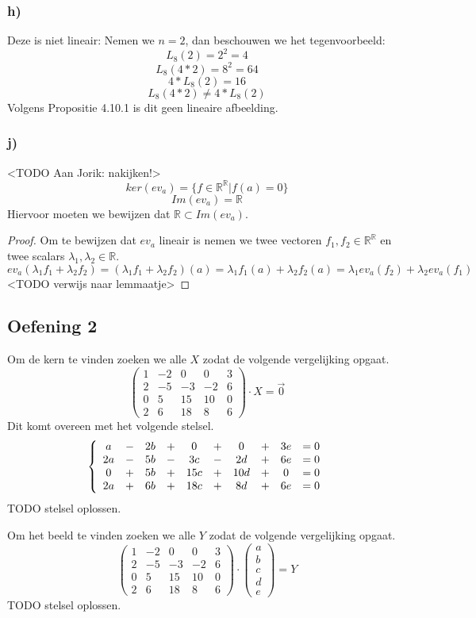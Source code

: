 \documentclass[lineaire_algebra_oplossingen.tex]{subfiles}
\begin{document}
\subsubsection*{h)}

Deze is niet lineair:
Nemen we $n=2$, dan beschouwen we het tegenvoorbeeld:
\[L_8(2) = 2^2 = 4\]
\[L_8(4*2) = 8^2 = 64\]
\[4*L_8(2) = 16\]
\[L_8(4*2) \neq 4*L_8(2)\]
Volgens Propositie 4.10.1 is dit geen lineaire afbeelding.\\

\subsubsection*{j)}
<TODO Aan Jorik: nakijken!>
\[
ker(ev_a) = \{ f \in \mathbb{R}^{\mathbb{R}} | f(a) = 0\}
\]
\[
Im(ev_a) = \mathbb{R}
\]
Hiervoor moeten we bewijzen dat $\mathbb{R} \subset Im(ev_a)$.
\begin{proof}
Om te bewijzen dat $ev_a$ lineair is nemen we twee vectoren $f_1,f_2 \in \mathbb{R}^{\mathbb{R}}$ en twee scalars $\lambda_1, \lambda_2 \in \mathbb{R}$.
\[
ev_a(\lambda_1f_1 + \lambda_2f_2) = (\lambda_1f_1 + \lambda_2f_2)(a) = \lambda_1f_1(a) + \lambda_2f_2(a) = \lambda_1ev_a(f_2) + \lambda_2ev_a(f_1)
\]
<TODO verwijs naar lemmaatje>
\end{proof}

\subsection{Oefening 2}
Om de kern te vinden zoeken we alle $X$ zodat de volgende vergelijking opgaat.
\[
\begin{pmatrix}
1 & -2 & 0 & 0 & 3\\
2 & -5 & -3 & -2 & 6\\
0 & 5 & 15 & 10 & 0\\
2 & 6 & 18 & 8 & 6
\end{pmatrix}
\cdot X
= \vec{0}
\]
Dit komt overeen met het volgende stelsel.
\[
\left\lbrace
\begin{array}{c c c c c c c c c c}
a &-& 2b &+& 0 &+& 0 &+& 3e &= 0\\
2a &-& 5b &-& 3c &-& 2d &+& 6e &= 0\\
0 &+& 5b &+& 15c &+& 10d &+& 0&= 0\\
2a &+& 6b &+& 18c &+& 8d &+& 6e &= 0
\end{array}
\right.
\]
TODO stelsel oplossen.

Om het beeld te vinden zoeken we alle $Y$ zodat de volgende vergelijking opgaat.
\[
\begin{pmatrix}
1 & -2 & 0 & 0 & 3\\
2 & -5 & -3 & -2 & 6\\
0 & 5 & 15 & 10 & 0\\
2 & 6 & 18 & 8 & 6
\end{pmatrix}
\cdot 
\begin{pmatrix}
a\\b\\c\\d\\e
\end{pmatrix}
= Y
\]
TODO stelsel oplossen.
\end{document}
